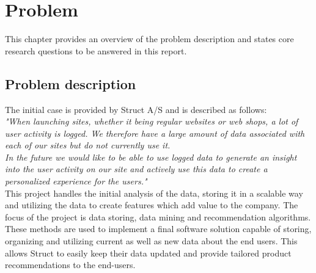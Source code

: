 
\chapter{Problem} %

\label{Problem} %

This chapter provides an overview of the problem description and states core research questions to be answered in this report.

\section{Problem description}

The initial case is provided by Struct A/S and is described as follows: \\

\textit{"When launching sites, whether it being regular websites or web shops, a lot of user activity is logged. We therefore have a large amount of data associated with each of our sites but do not currently use it.} \\
\textit{In the future we would like to be able to use logged data to generate an insight into the user activity on our site and actively use this data to create a personalized experience for the users."} \\

This project handles the initial analysis of the data, storing it in a scalable way and utilizing the data to create features which add value to the company. The focus of the project is data storing, data mining and recommendation algorithms. These methods are used to implement a final software solution capable of storing, organizing and utilizing current as well as new data about the end users. This allows Struct to easily keep their data updated and provide tailored product recommendations to the end-users.

